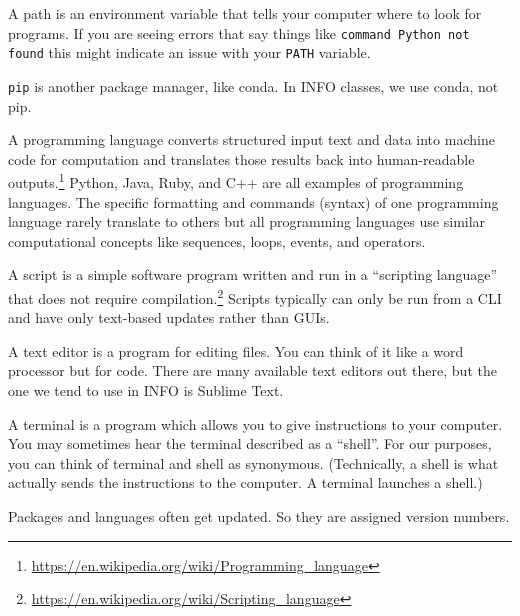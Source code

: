 \begin{description}[noitemsep]
    \item [PATH.] A path is an environment variable that tells your computer where to look for programs. If you are seeing errors that say things like \texttt{command Python not found} this might indicate an issue with your \texttt{PATH} variable.
    \item[\texttt{pip}.] \texttt{pip} is another package manager, like conda. In INFO classes, we use conda, not pip.
    \item[Programming language.] A programming language converts structured input text and data into machine code for computation and translates those results back into human-readable outputs.\footnote{\url{https://en.wikipedia.org/wiki/Programming_language}} Python, Java, Ruby, and C++ are all examples of programming languages. The specific formatting and commands (syntax) of one programming language rarely translate to others but all programming languages use similar computational concepts like sequences, loops, events, and operators.
    \item[Script.] A script is a simple software program written and run in a ``scripting language'' that does not require compilation.\footnote{\url{https://en.wikipedia.org/wiki/Scripting_language}} Scripts typically can only be run from a CLI and have only text-based updates rather than GUIs. 
    \item[Text editor.] A text editor is a program for editing files. You can think of it like a word processor but for code. There are many available text editors out there, but the one we tend to use in INFO is Sublime Text.
    \item[Terminal.] A terminal is a program which allows you to give instructions to your computer. You may sometimes hear the terminal described as a ``shell''. For our purposes, you can think of terminal and shell as synonymous. (Technically, a shell is what actually sends the instructions to the computer. A terminal launches a shell.)
    \item[Version.] Packages and languages often get updated. So they are assigned version numbers.
\end{description}